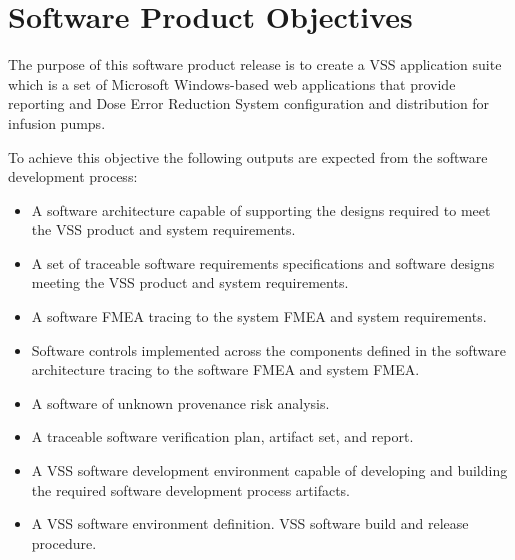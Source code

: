 \section{Software Product Objectives}
{The purpose of this software product release is to create a VSS application suite which is a set of Microsoft Windows-based web applications that provide reporting and Dose Error Reduction System configuration and distribution for infusion pumps.  

To achieve this objective the following outputs are expected from the software development process:
\begin{itemize}
  \item A software architecture capable of supporting the designs required to meet the VSS product and system requirements.
  \item A set of traceable software requirements specifications and software designs meeting the VSS product and system requirements.
  \item A software FMEA tracing to the system FMEA and system requirements.
  \item Software controls implemented across the components defined in the software architecture tracing to the software FMEA and system FMEA. 
  \item A software of unknown provenance risk analysis.
  \item A traceable software verification plan, artifact set, and report. 
  \item A VSS software development environment capable of developing and building the required software development process artifacts.
  \item A VSS software environment definition. 
  \itemA VSS software build and release procedure.
\end{itemize}
}
